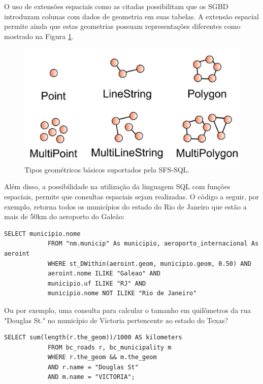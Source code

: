		O uso de extensões espaciais como as citadas possibilitam que os SGBD introduzam colunas com dados de geometria em suas tabelas. A extensão espacial permite ainda que estas geometrias possuam representações diferentes como mostrado na Figura \ref{fig:sfs-sql}. 
		
		\begin{figure}
			\centering
			\includegraphics[width=1\linewidth]{data/sfs-sql}
			\caption{Tipos geométricos básicos suportados pela SFS-SQL. \cite{QUEIROZ_etal13}}
			\label{fig:sfs-sql}
		\end{figure}
		
		Além disso, a possibilidade na utilização da linguagem SQL com funções espaciais, permite que consultas espaciais sejam realizadas. O código a seguir, por exemplo, retorna todos os municípios do estado do Rio de Janeiro que estão a mais de 50km do aeroporto do Galeão:
		
		\begin{lstlisting}[float,floatplacement=H]
			SELECT municipio.nome
			FROM "nm.municip" As municipio, aeroporto_internacional As aeroint 
			WHERE st_DWithin(aeroint.geom, municipio.geom, 0.50) AND 
			aeroint.nome ILIKE "Galeao" AND
			municipio.uf ILIKE "RJ" AND
			municipio.nome NOT ILIKE "Rio de Janeiro"
		\end{lstlisting}
		
		Ou por exemplo, uma consulta para calcular o tamanho em quilômetros da rua "Douglas St." no município de Victoria pertencente ao estado do Texas?
		
		\begin{lstlisting}[float,floatplacement=H]
			SELECT sum(length(r.the_geom))/1000 AS kilometers
			FROM bc_roads r, bc_municipality m
			WHERE r.the_geom && m.the_geom
			AND r.name = "Douglas St"
			AND m.name = "VICTORIA";
		\end{lstlisting}
		
